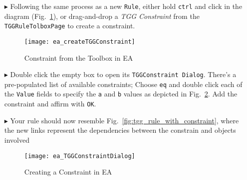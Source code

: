 \begin{enumerate}
\newpage

Believe it or not, our rule already creates a \texttt{Box}, \texttt{Dictionary}, and correspondence link between them at the same time, as-is! Unfortunately,
this only creates the objects, and doesn't relate any of there values. Why don't we try to connect the \texttt{name} of the \texttt{box} to the \texttt{title}
of the dictionary? I.e., if you have a \texttt{Kitten} LearningBox, you can transform it into a \texttt{Kitten} Dictionary. Luckily, we can once again use
\emph{attribute constraints}!\footnote{These were first defined in Part III, Section 4}. When used with TGG rules, attribute constraints provide a bidirectional
and high-level solution for attribute manipulation. We're looking for a constraint which ensures that \texttt{box.name} and \texttt{dictionary.title} are
consistent

\item[$\blacktriangleright$] Following the same process as a new \texttt{Rule}, either hold \texttt{ctrl} and click in the diagram
(Fig.~\ref{fig:common_toolbox}), or drag-and-drop a \emph{TGG Constraint} from the \texttt{TGGRuleTolboxPage} to create a constraint.

\begin{figure}[htbp]
\begin{center}
  \texttt{[image: ea\_createTGGConstraint]}
  \caption{Constraint from the Toolbox in EA}
  \label{fig:common_toolbox}
\end{center}
\end{figure}

\item[$\blacktriangleright$] Double click the empty box to open its \texttt{TGGConstraint Dialog}. There's a pre-populated list of available constraints; Choose
\texttt{eq} and double click each of the \texttt{Value} fields to specify the \texttt{a} and \texttt{b} values as depicted in
Fig.~\ref{fig:first_tgg_constraint}. Add the constraint and affirm with \texttt{OK}.

\item[$\blacktriangleright$] Your rule should now resemble Fig.~\ref{fig:tgg_rule_with_constraint}, where the new links represent the dependencies between the
  constrain and objects involved

\newpage

\begin{figure}[htbp]
\begin{center}
  \texttt{[image: ea\_TGGConstraintDialog]}
  \caption{Creating a Constraint in EA}
  \label{fig:first_tgg_constraint}
\end{center}
\end{figure}


\end{enumerate}
